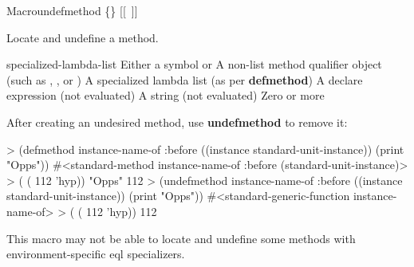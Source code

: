 \documentclass[10pt,twoside,english,pdftex]{article}
\begin{document}
\begin{functiondoc}{Macro}{undefmethod}{
    \{\}\superstar{}  
    \mbox{[[\superstar{} \vbar{} ]]}
    \superstar}
%
%
%
  
\fnsyntax

\fnpurpose Locate and undefine a method.

\fnpackage {}

\fnmodule {}

\fnargs
\begin{args}{specialized-lambda-list}
 Either a symbol or 
 A non-list method qualifier object (such as
, , or )
 A specialized lambda list (as per
\textbf{defmethod}) 
\arg[declarations] A declare expression (not evaluated)
\arg[documentation] A string (not evaluated)
\arg[forms] Zero or more 
\end{args}

\fnexample
{}%
%
After creating an undesired method, use \textbf{undefmethod} to remove it:
%
\W\supp
\begin{example}
> (defmethod instance-name-of :before ((instance standard-unit-instance))
     (print "Opps"))
#<standard-method instance-name-of :before (standard-unit-instance)>
> ( ( 112 'hyp))
"Opps" 
112
> (undefmethod instance-name-of :before ((instance standard-unit-instance))
     (print "Opps"))
#<standard-generic-function instance-name-of>
> ( ( 112 'hyp))
112
\end{example}

\fnnote This macro may not be able to locate and undefine some methods with
environment-specific eql specializers.

\end{functiondoc}

\end{document}
